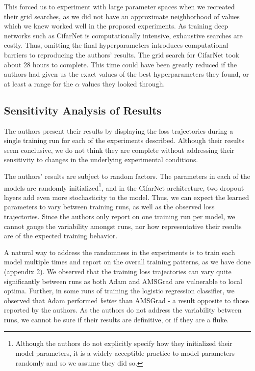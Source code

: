 \documentclass[letterpaper, 10 pt, conference]{ieeeconf}  %
\begin{document}
This forced us to experiment with large parameter spaces when we recreated their grid searches, as we did not have an approximate neighborhood of values which we knew worked well in the proposed experiments. As training deep networks such as CifarNet is computationally intensive, exhaustive searches are costly. Thus, omitting the final hyperparameters introduces computational barriers to reproducing the authors' results. The grid search for CifarNet took about 28 hours to complete. This time could have been greatly reduced if the authors had given us the exact values of the best hyperparameters they found, or at least  a range for the $\alpha$ values they looked through. 

\subsection{Sensitivity Analysis of Results}

The authors present their results by displaying the loss trajectories during a single training run for each of the experiments described. Although their results seem conclusive, we do not think they are complete without addressing their sensitivity to changes in the underlying experimental conditions.

The authors' results are subject to random factors. The parameters in each of the models are randomly initialized\footnote{Although the authors do not explicitly specify how they initialized their model parameters, it is a widely acceptible practice to model parameters randomly and so we assume they did so.}, and in the CifarNet architecture, two dropout layers add even more stochasticity to the model. Thus, we can expect the learned parameters to vary between training runs, as well as the observed loss trajectories. Since the authors only report on one training run per model, we cannot gauge the variability amongst runs, nor how representative their results are of the expected training behavior. 

A natural way to address the randomness in the experiments is to train each model multiple times and report on the overall training patterns, as we have done (appendix 2). We observed that the training loss trajectories can vary quite significantly between runs as both Adam and AMSGrad are vulnerable to local optima. Further, in some runs of training the logistic regression classifier, we observed that Adam performed \emph{better} than AMSGrad - a result opposite to those reported by the authors. As the authors do not address the variability between runs, we cannot be sure if their results are definitive, or if they are a fluke.
\end{document}
